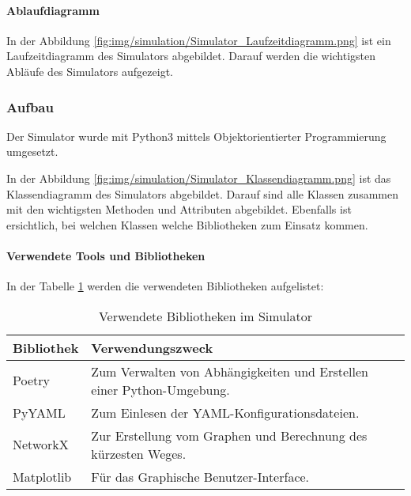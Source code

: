 \documentclass[../main.tex]{subfiles}
\begin{document}
\paragraph{Ablaufdiagramm}
In der Abbildung \ref{fig:img/simulation/Simulator_Laufzeitdiagramm.png} ist ein Laufzeitdiagramm des Simulators abgebildet. Darauf werden die wichtigsten Abläufe des Simulators aufgezeigt. 


\newpage
\subsubsection{Aufbau}

Der Simulator wurde mit Python3 mittels Objektorientierter Programmierung umgesetzt.

In der Abbildung \ref{fig:img/simulation/Simulator_Klassendiagramm.png} ist das Klassendiagramm des Simulators abgebildet. Darauf sind alle Klassen zusammen mit den wichtigsten Methoden und Attributen abgebildet.
Ebenfalls ist ersichtlich, bei welchen Klassen welche Bibliotheken zum Einsatz kommen.


\newpage
\paragraph{Verwendete Tools und Bibliotheken}

In der Tabelle \ref{tab:SimulatorBibliotheken} werden die verwendeten Bibliotheken aufgelistet:

\begin{table}[htbp!]
    \centering
    \begin{tabularx}{\textwidth}{| l | X |}
        \hline
        \textbf{Bibliothek} & \textbf{Verwendungszweck} \\ \hline
        Poetry & Zum Verwalten von Abhängigkeiten und Erstellen einer Python-Umgebung. \\ \hline
        PyYAML & Zum Einlesen der YAML-Konfigurationsdateien. \\ \hline
        NetworkX & Zur Erstellung vom Graphen und Berechnung des kürzesten Weges. \\ \hline
        Matplotlib & Für das Graphische Benutzer-Interface. \\ \hline
    \end{tabularx}
    \caption{Verwendete Bibliotheken im Simulator}
    \label{tab:SimulatorBibliotheken}
\end{table}
\end{document}
